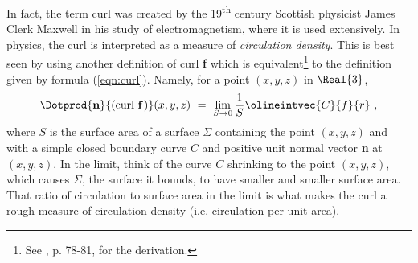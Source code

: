 In fact, the term curl was created by the 19\textsuperscript{th} century Scottish physicist James Clerk Maxwell in his
study of electromagnetism, where it is used extensively. In physics, the curl is interpreted as a measure of
\emph{circulation density}. This is best seen by using another definition of curl \textbf{f} which is
equivalent\footnote{See \cite{sch}, p. 78-81, for the derivation.} to the definition given by
formula (\ref{eqn:curl}). Namely, for a point $(x,y,z)$ in $\Real{3}$,
\begin{equation}\label{eqn:curlalt}
 \Dotprod{\textbf{n}}{(\text{curl}~\textbf{f}\,)}(x,y,z) ~=~ \lim_{S \to 0} \frac{1}{S} \olineintvec{C}{f}{r} ~,
\end{equation}
where $S$ is the surface area of a surface $\Sigma$ containing the point $(x,y,z)$ and with a simple closed boundary
curve $C$ and positive unit normal vector \textbf{n} at $(x,y,z)$. In the limit, think of the curve $C$ shrinking to
the point $(x,y,z)$, which causes $\Sigma$, the surface it bounds, to have smaller and smaller surface area. That ratio
of circulation to surface area in the limit is what makes the curl a rough measure of circulation density (i.e.
circulation per unit area).

